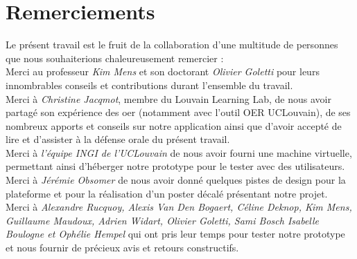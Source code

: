 \chapter*{Remerciements}

Le présent travail est le fruit de la collaboration d'une multitude de personnes que nous souhaiterions chaleureusement remercier : \\

Merci au professeur \textit{Kim Mens} et son doctorant \textit{Olivier Goletti} pour leurs innombrables conseils et contributions durant l'ensemble du travail. \\

Merci à \textit{Christine Jacqmot}, membre du Louvain Learning Lab, de nous avoir partagé son expérience des \Gls{oer} (notamment avec l'outil OER UCLouvain), de ses nombreux apports et conseils sur notre application ainsi que d'avoir accepté de lire et d'assister à la défense orale du présent travail.\\

Merci à \textit{l'équipe INGI de l'UCLouvain} de nous avoir fourni une machine virtuelle, permettant ainsi d'héberger notre prototype pour le tester avec des utilisateurs. \\

Merci à \textit{Jérémie Obsomer} de nous avoir donné quelques pistes de design pour la plateforme et pour la réalisation d'un poster décalé  présentant notre projet.\\

Merci à \textit{Alexandre Rucquoy, Alexis Van Den Bogaert, Céline Deknop, Kim Mens, Guillaume Maudoux, Adrien Widart, Olivier Goletti, Sami Bosch Isabelle Boulogne et Ophélie Hempel} qui ont pris leur temps pour tester notre prototype et nous fournir de précieux avis et retours constructifs.